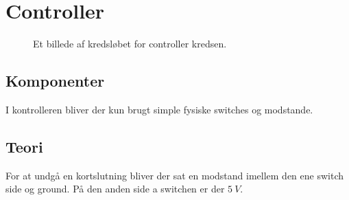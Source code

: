 \section{Controller}
\begin{figure}[H]	
	\centering
	\caption{Et billede af kredsløbet for controller kredsen.}
	\label{kreds:controller}
\end{figure}

\subsection{Komponenter}
I kontrolleren bliver der kun brugt simple fysiske switches og modstande.

\subsection{Teori}
For at undgå en kortslutning bliver der sat en modstand imellem den ene switch side og ground. På den anden side a switchen er der $\SI{5}{V}$.

